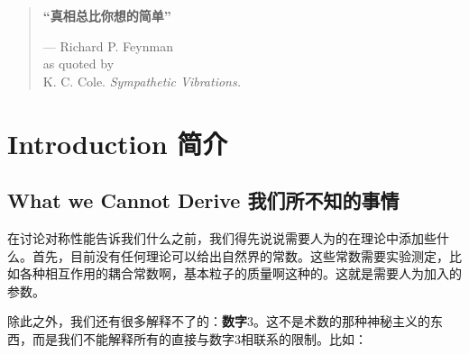

\begin{quote}%
{\bfseries “真相总比你想的简单”}


\begin{flushright}
--- Richard P. Feynman\\
as quoted by\\
K. C. Cole. {\itshape Sympathetic Vibrations.}
\end{flushright}
\end{quote}




\chapter[简介]{Introduction 简介}\label{chap1}

\section[我们所不知的事情]{What we Cannot Derive 我们所不知的事情}\label{sec1.1}

在讨论对称性能告诉我们什么之前，我们得先说说需要人为的在理论中添加些什么。首先，目前没有任何理论可以给出自然界的常数。这些常数需要实验测定，比如各种相互作用的耦合常数啊，基本粒子的质量啊这种的。这就是需要人为加入的参数。

除此之外，我们还有很多解释不了的：{\bfseries 数字$3$}。这不是术数的那种神秘主义的东西，而是我们不能解释所有的直接与数字$3$相联系的限制。比如：

